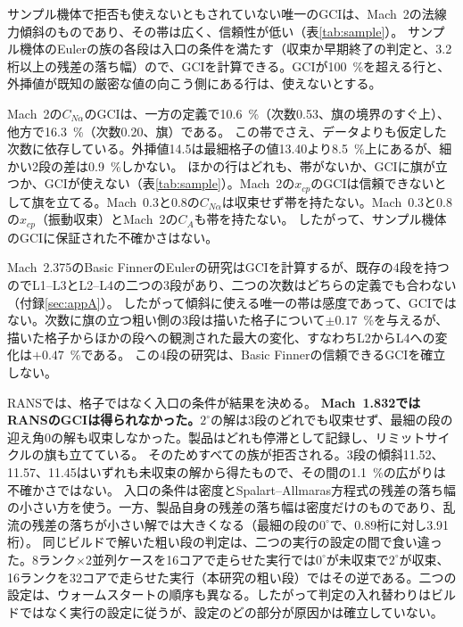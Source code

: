 \documentclass[twocolumn]{labreport}
\newcommand{\CNa}{C_{N\alpha}}
\begin{document}
サンプル機体で拒否も使えないともされていない唯一のGCIは、Mach~2の法線力傾斜のものであり、その帯は広く、信頼性が低い（表\ref{tab:sample}）。
サンプル機体のEulerの族の各段は入口の条件を満たす（収束か早期終了の判定と、3.2桁以上の残差の落ち幅）ので、GCIを計算できる。GCIが100~\%を超える行と、外挿値が既知の厳密な値の向こう側にある行は、使えないとする。

Mach~2の$\CNa$のGCIは、一方の定義で10.6~\%（次数0.53、旗の境界のすぐ上）、他方で16.3~\%（次数0.20、旗）である。
この帯でさえ、データよりも仮定した次数に依存している。外挿値14.5は最細格子の値13.40より8.5~\%上にあるが、細かい2段の差は0.9~\%しかない。
ほかの行はどれも、帯がないか、GCIに旗が立つか、GCIが使えない（表\ref{tab:sample}）。Mach~2の$x_{cp}$のGCIは信頼できないとして旗を立てる。Mach~0.3と0.8の$\CNa$は収束せず帯を持たない。Mach~0.3と0.8の$x_{cp}$（振動収束）とMach~2の$C_A$も帯を持たない。
したがって、サンプル機体のGCIに保証された不確かさはない。

Mach~2.375のBasic FinnerのEulerの研究はGCIを計算するが、既存の4段を持つのでL1--L3とL2--L4の二つの3段があり、二つの次数はどちらの定義でも合わない（付録\ref{sec:appA}）。
したがって傾斜に使える唯一の帯は感度であって、GCIではない。次数に旗の立つ粗い側の3段は描いた格子について$\pm0.17$~\%を与えるが、描いた格子からほかの段への観測された最大の変化、すなわちL2からL4への変化は$+0.47$~\%である。
この4段の研究は、Basic Finnerの信頼できるGCIを確立しない。

RANSでは、格子ではなく入口の条件が結果を決める。
\textbf{Mach~1.832ではRANSのGCIは得られなかった。}$2^\circ$の解は3段のどれでも収束せず、最細の段の迎え角0の解も収束しなかった。製品はどれも停滞として記録し、リミットサイクルの旗も立てている。
そのためすべての族が拒否される。3段の傾斜11.52、11.57、11.45はいずれも未収束の解から得たもので、その間の1.1~\%の広がりは不確かさではない。
入口の条件は密度とSpalart--Allmaras方程式の残差の落ち幅の小さい方を使う。一方、製品自身の残差の落ち幅は密度だけのものであり、乱流の残差の落ちが小さい解では大きくなる（最細の段の$0^\circ$で、0.89桁に対し3.91桁）。
同じビルドで解いた粗い段の判定は、二つの実行の設定の間で食い違った。8ランク$\times$2並列ケースを16コアで走らせた実行では$0^\circ$が未収束で$2^\circ$が収束、16ランクを32コアで走らせた実行（本研究の粗い段）ではその逆である。二つの設定は、ウォームスタートの順序も異なる。したがって判定の入れ替わりはビルドではなく実行の設定に従うが、設定のどの部分が原因かは確立していない。
\end{document}
